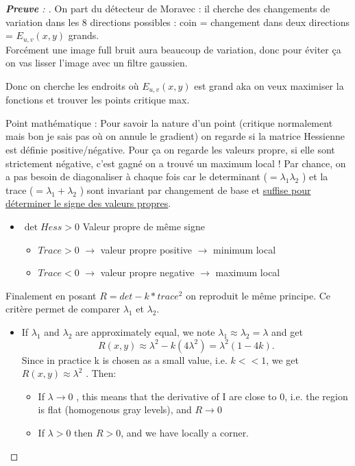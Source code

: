 \documentclass{article}
\theoremstyle{plain}%
\theoremstyle{definition}
\theoremstyle{remark}
\begin{document}
\begin{proof}[\textbf{Preuve} : ]
    On part du détecteur de Moravec : il cherche des changements de variation dans les 8 directions possibles : coin = changement dans deux directions = $ E_{u,v}(x,y) $ grands. \\
    Forcément une image full bruit aura beaucoup de variation, donc pour éviter ça on vas lisser l'image avec un filtre gaussien.

    Donc on cherche les endroits où $ E_{u,v}(x,y) $ est grand aka on veux maximiser la fonctions et trouver les points critique max.

    Point mathématique : Pour savoir la nature d'un point (critique normalement mais bon je sais pas où on annule le gradient) on regarde si la matrice Hessienne est définie positive/négative. Pour ça on regarde les valeurs propre, si elle sont strictement négative, c'est gagné on a trouvé un maximum local ! Par chance, on a pas besoin de diagonaliser à chaque fois car le determinant ($ = \lambda _1 \lambda _2 $ ) et la trace ($ = \lambda _1 + \lambda _2 $ ) sont invariant par changement de base et \href{http://serge.mehl.free.fr/anx/extremum_hesse.html}{suffise pour déterminer le signe des valeurs propres}. \begin{itemize}
        \item $ \det Hess > 0 $ Valeur propre de même signe \begin{itemize}
            \item $ Trace > 0 $ $\rightarrow$ valeur propre positive $\rightarrow$ minimum local
            \item $ Trace < 0 $ $\rightarrow$ valeur propre negative $\rightarrow$ maximum local
        \end{itemize}
    \end{itemize}

    Finalement en posant $ R = det - k*trace^2 $ on reproduit le même principe. Ce critère permet de comparer $ \lambda _1 $ et $ \lambda _2 $.
    \begin{itemize}
        \item If $ \lambda _1 $  and $ \lambda _2 $  are approximately equal, we note $ \lambda _1 \approx  \lambda _2 = \lambda $ and get 
        \[
        R(x,y) \approx \lambda ^2 - k(4 \lambda ^2) = \lambda ^2 (1 - 4k)
        .\]
        Since in practice k is chosen as a small value, i.e. $ k << 1$, we get $ R(x,y) \approx \lambda ^2 $  . Then:
        \begin{itemize}
            \item If $ \lambda \to 0 $ , this means that the derivative of I are close to 0, i.e. the region is flat (homogenous gray levels), and $ R \to 0 $
            \item If $ \lambda > 0 $  then $R > 0$, and we have locally a corner.
        \end{itemize}


\end{itemize}
\end{proof}
\end{document}
